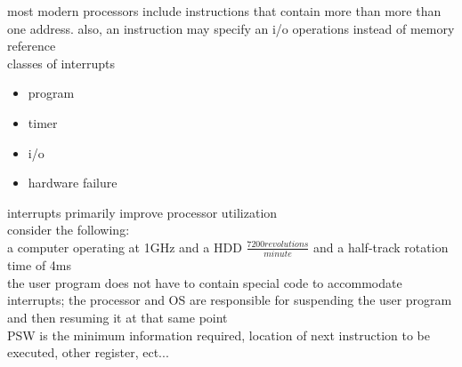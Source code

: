 \documentclass{article}
\begin{document}
most modern processors include instructions that contain more than more than one address. also, an instruction may specify an i/o operations instead of memory reference\\

classes of interrupts
	\begin{itemize}
		\item program
		\item timer
		\item i/o
		\item hardware failure
	\end{itemize}

interrupts primarily improve processor utilization\\
consider the following:\\
a computer operating at 1GHz and a HDD $\frac{7200revolutions}{minute}$ and a half-track rotation time of 4ms\\

the user program does not have to contain special code to accommodate interrupts; the processor and OS are responsible for suspending the user program and then resuming it at that same point\\

PSW is the minimum information required, location of next instruction to be executed, other register, ect...\\
\end{document}
